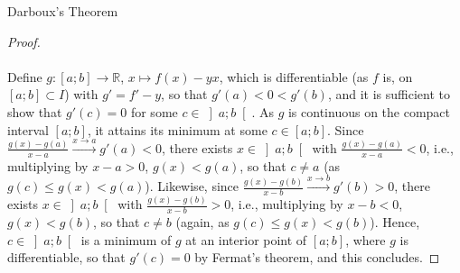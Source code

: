 \begin{appendixitem}{Darboux's Theorem}
\begin{proof}
        \\\\
        Define \( g \colon \left[a;b\right] \to \mathbb{R} \), \( x \mapsto f\left(x\right)-yx \), which is differentiable (as \( f \) is, on \( \left[a;b\right] \subset I \)) with \( g' = f'-y \), so that \( g'\left(a\right) < 0 < g'\left(b\right) \), and it is sufficient to show that \( g'\left(c\right) = 0 \) for some \( c \in \left]a;b\right[ \). As \( g \) is continuous on the compact interval \( \left[a;b\right] \), it attains its minimum at some \( c \in \left[a;b\right] \). Since \( \frac{g\left(x\right)-g\left(a\right)}{x-a} \overset{x \to a}{\longrightarrow} g'\left(a\right) < 0 \), there exists \( x \in \left]a;b\right[ \) with \( \frac{g\left(x\right)-g\left(a\right)}{x-a} < 0 \), i.e., multiplying by \( x-a > 0 \), \( g\left(x\right) < g\left(a\right) \), so that \( c \neq a \) (as \( g\left(c\right) \leq g\left(x\right) < g\left(a\right) \)). Likewise, since \( \frac{g\left(x\right)-g\left(b\right)}{x-b} \overset{x \to b}{\longrightarrow} g'\left(b\right) > 0 \), there exists \( x \in \left]a;b\right[ \) with \( \frac{g\left(x\right)-g\left(b\right)}{x-b} > 0 \), i.e., multiplying by \( x-b < 0 \), \( g\left(x\right) < g\left(b\right) \), so that \( c \neq b \) (again, as \( g\left(c\right) \leq g\left(x\right) < g\left(b\right) \)). Hence, \( c \in \left]a;b\right[ \) is a minimum of \( g \) at an interior point of \( \left[a;b\right] \), where \( g \) is differentiable, so that \( g'\left(c\right) = 0 \) by Fermat's theorem, and this concludes.
    \end{proof}
\end{appendixitem}
